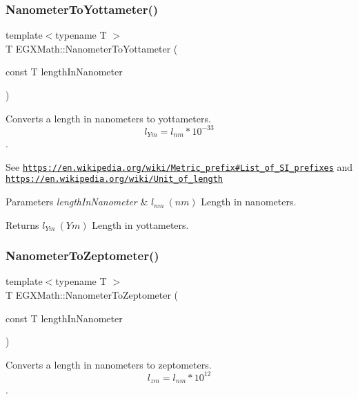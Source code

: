 \subsubsection{\texorpdfstring{Nanometer\+To\+Yottameter()}{NanometerToYottameter()}}
{\footnotesize\ttfamily template$<$typename T $>$ \\
T E\+G\+X\+Math\+::\+Nanometer\+To\+Yottameter (\begin{DoxyParamCaption}\item[{const T}]{length\+In\+Nanometer }\end{DoxyParamCaption})}



Converts a length in nanometers to yottameters. \[ l_{Ym}=l_{nm} * 10^{-33} \]. 

See \href{https://en.wikipedia.org/wiki/Metric_prefix#List_of_SI_prefixes}{\tt https\+://en.\+wikipedia.\+org/wiki/\+Metric\+\_\+prefix\#\+List\+\_\+of\+\_\+\+S\+I\+\_\+prefixes} and \href{https://en.wikipedia.org/wiki/Unit_of_length}{\tt https\+://en.\+wikipedia.\+org/wiki/\+Unit\+\_\+of\+\_\+length} 
\begin{DoxyParams}{Parameters}
{\em length\+In\+Nanometer} & $ l_{nm}\ (nm)$ Length in nanometers. \\
\hline
\end{DoxyParams}
\begin{DoxyReturn}{Returns}
$ l_{Ym}\ (Ym)$ Length in yottameters. 
\end{DoxyReturn}
\mbox{\label{group___e_g_x_math-_conversions-_length_conversions-_nanometer-_s_i_ga3104d856008f94fc14378e95cfbe771f}} 
\subsubsection{\texorpdfstring{Nanometer\+To\+Zeptometer()}{NanometerToZeptometer()}}
{\footnotesize\ttfamily template$<$typename T $>$ \\
T E\+G\+X\+Math\+::\+Nanometer\+To\+Zeptometer (\begin{DoxyParamCaption}\item[{const T}]{length\+In\+Nanometer }\end{DoxyParamCaption})}



Converts a length in nanometers to zeptometers. \[ l_{zm}=l_{nm} * 10^{12} \]. 


